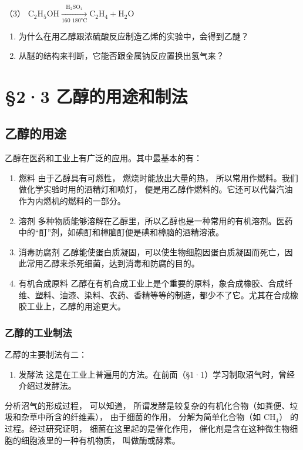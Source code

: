 （3）
\(\mathrm{C_2H_5OH\xrightarrow[\text{160~180°C}]{\mathrm{H_2SO_4}} C_2H_4 + H_2O}\)

\begin{enumerate}[start=5]
\item
  为什么在用乙醇跟浓硫酸反应制造乙烯的实验中，会得到乙醚？
\item
  从醚的结构来判断，它能否跟金属钠反应置换出氢气来？
\end{enumerate}

\section{§2·3 乙醇的用途和制法}

\subsection{乙醇的用途}

乙醇在医药和工业上有广泛的应用。其中最基本的有：

\begin{enumerate}
\item
  燃料 由于乙醇具有可燃性， 燃烧时能放出大量的热，
  所以常用作燃料。我们做化学实验时用的酒精灯和喷灯，
  便是用乙醇作燃料的。它还可以代替汽油作为内燃机的燃料的一部分。
\item
  溶剂
  多种物质能够溶解在乙醇里，所以乙醇也是一种常用的有机溶剂。医药中的``酊''剂，如碘酊和樟脑酊便是碘和樟脑的酒精溶液。
\item
  消毒防腐剂
  乙醇能使蛋白质凝固，可以使生物细胞因蛋白质凝固而死亡，因此常用乙醇来杀死细菌，达到消毒和防腐的目的。
\item
  有机合成原料
  乙醇在有机合成工业上是个重要的原料，象合成橡胶、合成纤维、塑料、油漆、染料、农药、香精等等的制造，都少不了它。尤其在合成橡胶工业上，乙醇的用途更大。
\end{enumerate}

\subsubsection{乙醇的工业制法}

乙醇的主要制法有二：

\begin{enumerate}
\item
  发酵法
  这是在工业上普遍用的方法。在前面（§1·1）学习制取沼气时，曾经介绍过发酵法。
\end{enumerate}

分析沼气的形成过程， 可以知道，
所谓发酵是较复杂的有机化合物（如粪便、垃圾和杂草中所含的纤维素），
由于细菌的作用， 分解为简单化合物（如 \(\mathrm{CH}_4\)）
的过程。经过研究证明， 细菌在这里起的是催化作用，
催化剂是含在这种微生物细胞的细胞液里的一种有机物质， 叫做酶或酵素。

